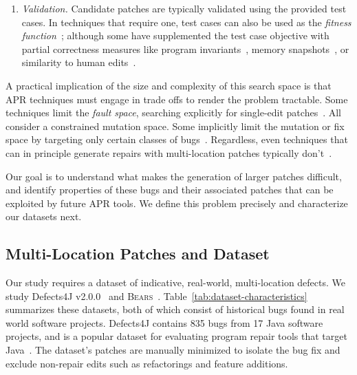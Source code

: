 \documentclass[10pt, conference]{IEEEtran}
\newcommand\bears{\textsc{Bears}\xspace}
\begin{document}
\begin{enumerate}[wide]
\item \emph {Validation.}
Candidate patches are typically
validated using the provided test cases. In techniques
that require one, test cases can also be used as the \emph{fitness
  function}~\cite{genprog}; although some have supplemented the test case
objective with partial correctness measures like program
invariants~\cite{dinglyu}, memory snapshots~\cite{source-code-checkpoint}, or
similarity to human edits~\cite{hdrepair}.

\end{enumerate}

A practical implication of the size and complexity of this search space is
that APR techniques must engage in trade offs to render the problem tractable. 
Some techniques limit the \emph{fault space},
searching explicitly for single-edit patches~\cite{rsrepair,ae,hdrepair,capgen}.
All consider a constrained mutation space. 
Some implicitly limit the mutation or fix space by targeting only certain
classes of bugs~\cite{Xuan17,sapfix,DeMarco14,par}. Regardless, even techniques
that can in principle generate repairs with multi-location patches typically
don't~\cite{patch-correctness}.
%

Our goal is to understand what makes the generation of larger
patches difficult, and identify properties of these bugs and their associated
patches that can be exploited by future APR tools.  
We define this problem precisely and characterize our datasets next.

\subsection{Multi-Location Patches and Dataset}
\label{sec:bugs}

Our study requires a dataset of indicative, real-world,
multi-location defects.  We study 
Defects4J v2.0.0~\cite{defects4j} and \bears~\cite{bears}.  Table~\ref{tab:dataset-characteristics}
summarizes these datasets, both of which
consist of historical
bugs found in real world software projects. Defects4J contains 835 bugs from 
17 Java software projects, and is a popular dataset for evaluating 
program repair tools that target 
Java~\cite{durieux-repair-them-all,pearson2017evaluating,saha2017elixir,saha2019harnessing,xin2017leveraging,b2016learning}.
The dataset's patches are manually minimized to isolate the bug fix 
and exclude non-repair edits such as refactorings and feature additions.
\end{document}
